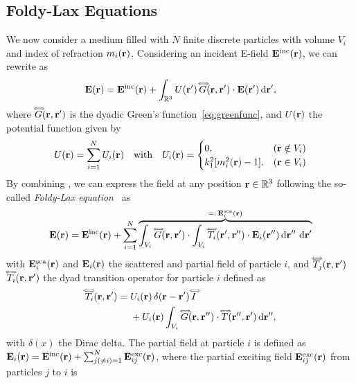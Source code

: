\subsection{Foldy-Lax Equations}
\label{ssec:foldy-lax}
%
We now consider a medium filled with $N$ finite discrete particles with volume $V_i$ and index of refraction $m_i(\mathbf{r})$. Considering an incident E-field $\mathbf{E}^\text{inc}(\mathbf{r})$, we can rewrite  as
%
\begin{equation}
    \mathbf{E}(\mathbf{r}) = \mathbf{E}^\text{inc}(\mathbf{r}) + \int_{\mathbb{R}^3} U(\mathbf{r}')\,\accentset{\Longleftrightarrow}{G}(\mathbf{r},\mathbf{r}') \cdot \mathbf{E}(\mathbf{r}') \,\text{d}\mathbf{r}',
    \label{eq:EfieldParticles}
\end{equation}
%
where $\accentset{\Longleftrightarrow}{G}(\mathbf{r},\mathbf{r}')$ is the dyadic Green's function~\eqref{eq:greenfunc}, and $U(\mathbf{r})$ the potential function given by
%
\begin{equation}
    U(\mathbf{r}) = \sum_{i=1}^{N} U_i(\mathbf{r}) \quad \text{with} \quad U_i(\mathbf{r}) = \begin{cases} 
    0, & (\mathbf{r} \notin V_i)\\ 
    k_1^2[m_i^2(\mathbf{r})-1]. & (\mathbf{r} \in V_i)
    \end{cases}
    \label{eq:potential}
\end{equation}
%
By combining , we can express the field at any position $\mathbf{r}\in\mathbb{R}^3$ following the so-called \emph{Foldy-Lax equation}~\cite{foldy1945multiple,lax1951multiple} as
%
\begin{equation}
\mathbf{E}(\mathbf{r}) = \mathbf{E}^\text{inc}(\mathbf{r}) + \sum_{i=1}^N \overbrace{\int_{V_i} \accentset{\Longleftrightarrow}{G}(\mathbf{r},\mathbf{r}')\cdot \int_{V_i} \accentset{\Longleftrightarrow}{T}_i(\mathbf{r}',\mathbf{r}'') \cdot  \mathbf{E}_i(\mathbf{r}'') \,\text{d}\mathbf{r}''\,\,\text{d}\mathbf{r}'}^{=\vcentcolon \,\mathbf{E}^\text{sca}_i(\mathbf{r})}    \label{eq:foldylax}
\end{equation}
%
with $\mathbf{E}^\text{sca}_i(\mathbf{r})$ and $\mathbf{E}_i(\mathbf{r})$ the scattered and partial field of particle $i$, and $\accentset{\Longleftrightarrow}{T}_j(\mathbf{r},\mathbf{r}')$ $\accentset{\Longleftrightarrow}{T}_i(\mathbf{r},\mathbf{r}')$ the dyad transition operator for particle $i$ defined as~\cite{tsang1985theory} 
\begin{equation}
\label{eq:dyadtransition}
    \begin{split}
        \accentset{\Longleftrightarrow}{T}_i(\mathbf{r},\mathbf{r}') =\;& U_i(\mathbf{r}) \,\delta(\mathbf{r}-\mathbf{r}')\,\accentset{\Longleftrightarrow}{I} \\
        & + U_i(\mathbf{r}) \int_{V_i} \accentset{\Longleftrightarrow}{G}(\mathbf{r},\mathbf{r}'') \cdot \accentset{\Longleftrightarrow}{T}(\mathbf{r}'',\mathbf{r}') \,\text{d}\mathbf{r}'',
    \end{split}
\end{equation}
%
with $\delta(x)$ the Dirac delta. 
%
The partial field at particle $i$ is defined as $\mathbf{E}_i(\mathbf{r})=\mathbf{E}^\text{inc}(\mathbf{r}) + \sum_{j(\neq i)=1}^N \mathbf{E}^\text{exc}_{ij}(\mathbf{r})$, where the partial exciting field $\mathbf{E}^\text{exc}_{ij}(\mathbf{r})$ from particles $j$ to $i$ is 
